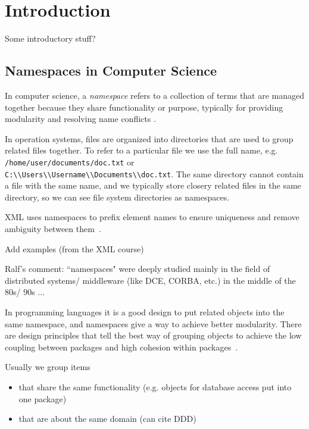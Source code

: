 \section{Introduction}

Some introductory stuff?

\subsection{Namespaces in Computer Science}

In computer science, a \emph{namespace} refers to a collection of terms that are managed
together because they share functionality or purpose, typically for providing modularity
and resolving name conflicts \cite{duval2002metadata}.


In operation systems, files are organized into directories that are used to group related
files together. To refer to a particular file we use the full name, e.g. 
\verb|/home/user/documents/doc.txt| or \verb|C:\\Users\\Username\\Documents\\doc.txt|. 
The same directory cannot contain a file with the same name, and we typically store closery
related files in the same directory, so we can see file system directories as namespaces. 


XML uses namespaces to prefix element names to ensure uniqueness and remove 
ambiguity between them~\cite{xmlnamespaces}. 

Add examples (from the XML course)

Ralf's comment: ``namespaces" were deeply studied mainly in
the field of distributed systems/ middleware (like DCE, CORBA, etc.) in the middle
of the 80s/ 90s ...



In programming languages it is a good design to put related objects
into the same namespace, and namespaces give a way to achieve better modularity.
There are design principles that tell the best way of grouping objects to
achieve the low coupling between packages and high cohesion within packages~\cite{larman2005applying}.

Usually we group items 

\begin{itemize}
  \item that share the same functionality  (e.g. objects for database access put into one package)
  \item that are about the same domain (can cite DDD)
\end{itemize}

